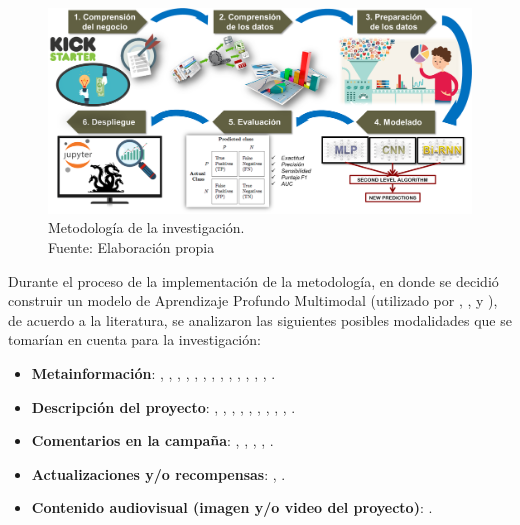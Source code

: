 \begin{figure}[htbp]
	\begin{center}
		\includegraphics[width=1\textwidth]{3/figures/metodologia.png}
		\caption[Metodología de la investigación]{Metodología de la investigación.\\
			Fuente: Elaboración propia}
		\label{3:fig2}
	\end{center}
\end{figure}

Durante el proceso de la implementación de la metodología, en donde se decidió construir un modelo de Aprendizaje Profundo Multimodal (utilizado por \cite{pr_kamath2018suplearn}, \cite{pr_jin2019dayssuccess}, y \cite{pr_cheng2019deeplearning}), de acuerdo a la literatura, se analizaron las siguientes posibles modalidades que se tomarían en cuenta para la investigación:

\begin{itemize}
	\item \textbf{Metainformación}: \cite{pr_chen2013kickpredict}, \cite{pr_mitra2014phrases}, \cite{pr_zhou2015projectdesc}, \cite{pr_chen2015predcrowd}, \cite{pr_beckwith2016predcrowd}, \cite{pr_li2016predcrowd}, \cite{pr_yuan2016textanalytics}, \cite{pr_sawhney2016usingLT}, \cite{pr_kaur2017socmedcrowd}, \cite{pr_kamath2018suplearn}, \cite{pr_yu2018deeplearning}, \cite{pr_jin2019dayssuccess}, \cite{pr_cheng2019deeplearning}, \cite{pr_fernandezblanco2020crowdfunding_empirical}.
	\item \textbf{Descripción del proyecto}: \cite{pr_mitra2014phrases}, \cite{pr_zhou2015projectdesc}, \cite{pr_yuan2016textanalytics}, \cite{pr_sawhney2016usingLT}, \cite{pr_kamath2018suplearn}, \cite{pr_lee2018contentDL}, \cite{pr_jin2019dayssuccess}, \cite{pr_cheng2019deeplearning}, \cite{pr_chen2019keywords_crowdfunding}, \cite{pr_chaichi2019nlp_3dprinting}.
	\item \textbf{Comentarios en la campaña}: \cite{pr_chen2015predcrowd}, \cite{pr_li2016predcrowd}, \cite{pr_lee2018contentDL}, \cite{pr_jin2019dayssuccess}, \cite{pr_shafqat2019topicpredictions}.
	\item \textbf{Actualizaciones y/o recompensas}: \cite{pr_zhou2015projectdesc}, \cite{pr_lee2018contentDL}.
	\item \textbf{Contenido audiovisual (imagen y/o video del proyecto)}: \cite{pr_cheng2019deeplearning}.
\end{itemize}

